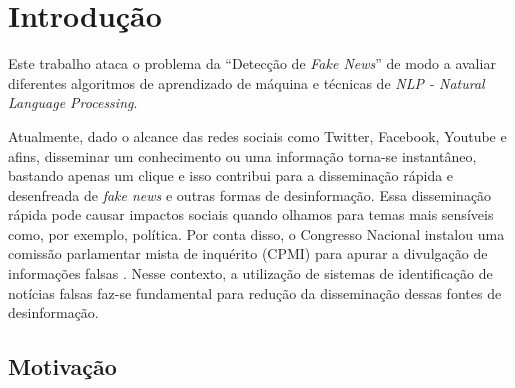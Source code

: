 \section{Introdução}


 Este trabalho ataca o problema da ``Detecção de \textit{Fake News}''\citep{ZHANG2020102025} de modo a avaliar diferentes algoritmos de aprendizado de máquina e técnicas de \textit{NLP - \textit{Natural Language Processing}}. 

Atualmente, dado o alcance das redes sociais como Twitter, Facebook, Youtube e afins, disseminar um conhecimento ou uma informação torna-se instantâneo, bastando apenas um clique e isso contribui para a disseminação rápida e desenfreada de \textit{fake news} e outras formas de desinformação. Essa disseminação rápida pode causar impactos sociais quando olhamos para temas mais sensíveis como, por exemplo, política. Por conta disso, o Congresso Nacional instalou uma comissão parlamentar mista de inquérito (CPMI)  para apurar a divulgação de informações falsas \citep{g12019}. Nesse contexto, a utilização de sistemas de identificação de notícias falsas faz-se fundamental para redução da disseminação dessas fontes de desinformação.






\subsection{Motivação}



